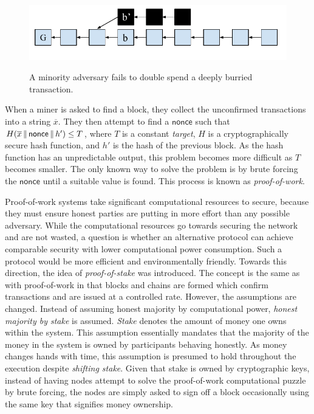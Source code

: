 \begin{figure}[h]
    \caption{
    A minority adversary fails to double spend a deeply burried transaction.
    }
    \centering
    \includegraphics[width=0.7\columnwidth,keepaspectratio]{chapters/introduction/figures/adversary-race.pdf}
    \label{fig.adversary-race}
\end{figure}

When a miner is asked to find a block, they collect the unconfirmed transactions
into a string $\overline{x}$. They then attempt to find a $\textsf{nonce}$ such
that $H(\overline{x} \,\|\, \textsf{nonce} \,\|\, h') \leq T$, where $T$ is a constant
\emph{target}, $H$ is a cryptographically secure hash function, and $h'$ is the
hash of the previous block. As the hash
function has an unpredictable output, this problem becomes more difficult as $T$
becomes smaller. The only known way to solve the problem is by brute forcing the
$\textsf{nonce}$ until a suitable value is found. This process is known as
\emph{proof-of-work}.

Proof-of-work systems take significant computational resources to secure,
because they must ensure honest parties are putting in more effort than any
possible adversary. While the computational resources go towards securing the
network and are not wasted, a question is whether an alternative protocol can
achieve comparable security with lower computational power consumption. Such a
protocol would be more efficient and environmentally friendly. Towards this
direction, the idea of \emph{proof-of-stake} was introduced. The concept is the
same as with proof-of-work in that blocks and chains are formed which confirm
transactions and are issued at a controlled rate. However, the assumptions are
changed. Instead of assuming honest majority by computational power,
\emph{honest majority by stake} is assumed. \emph{Stake} denotes the amount of
money one owns within the system. This assumption essentially mandates that the
majority of the money in the system is owned by participants behaving honestly.
As money changes hands with time, this assumption is presumed to hold throughout
the execution despite \emph{shifting stake}. Given that stake is owned by
cryptographic keys, instead of having nodes attempt to solve the proof-of-work
computational puzzle by brute forcing, the nodes are simply asked to sign off
a block occasionally using the same key that signifies money ownership.

